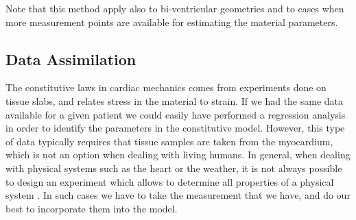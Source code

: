 Note that this method apply also to bi-ventricular geometries and to
cases when more measurement points are available for estimating the
material parameters. 













\subsection{Data Assimilation}
The constitutive laws in cardiac mechanics comes from experiments
done on tissue slabs, and relates stress in the material to strain.
If we had the same data available for a given patient we could easily
have performed a regression analysis in order to identify the
parameters in the constitutive model. However, this type of data
typically requires that tissue samples are taken from the myocardium,
which is not an option when dealing with living humans. In general,
when dealing with physical systems such as the heart or the weather,
it is not always possible to design an experiment which
allows to determine all properties of a physical system
\cite{chapelle2013fundamental}. In such cases we have to take the
measurement that we have, and do our best to incorporate them into the
model. 

